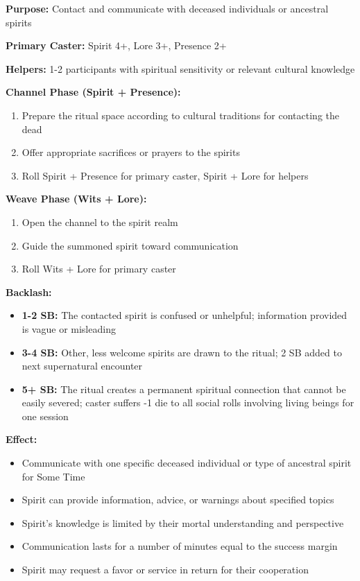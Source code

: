 \textbf{Purpose:} Contact and communicate with deceased individuals or ancestral spirits

\textbf{Primary Caster:} Spirit 4+, Lore 3+, Presence 2+

\textbf{Helpers:} 1-2 participants with spiritual sensitivity or relevant cultural knowledge

\textbf{Channel Phase (Spirit + Presence):}
\begin{enumerate}
\item Prepare the ritual space according to cultural traditions for contacting the dead
\item Offer appropriate sacrifices or prayers to the spirits
\item Roll Spirit + Presence for primary caster, Spirit + Lore for helpers
\end{enumerate}

\textbf{Weave Phase (Wits + Lore):}
\begin{enumerate}
\item Open the channel to the spirit realm
\item Guide the summoned spirit toward communication
\item Roll Wits + Lore for primary caster
\end{enumerate}

\textbf{Backlash:}
\begin{itemize}
\item \textbf{1-2 SB:} The contacted spirit is confused or unhelpful; information provided is vague or misleading
\item \textbf{3-4 SB:} Other, less welcome spirits are drawn to the ritual; 2 SB added to next supernatural encounter
\item \textbf{5+ SB:} The ritual creates a permanent spiritual connection that cannot be easily severed; caster suffers -1 die to all social rolls involving living beings for one session
\end{itemize}

\textbf{Effect:}
\begin{itemize}
\item Communicate with one specific deceased individual or type of ancestral spirit for Some Time
\item Spirit can provide information, advice, or warnings about specified topics
\item Spirit's knowledge is limited by their mortal understanding and perspective
\item Communication lasts for a number of minutes equal to the success margin
\item Spirit may request a favor or service in return for their cooperation
\end{itemize}

